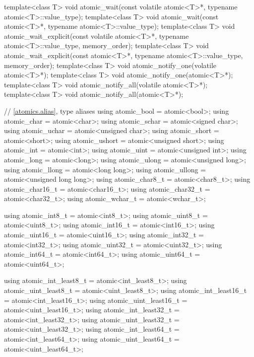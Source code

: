 \begin{codeblock}
{  template<class T>
    void atomic_wait(const volatile atomic<T>*, typename atomic<T>::value_type);
  template<class T>
    void atomic_wait(const atomic<T>*, typename atomic<T>::value_type);
  template<class T>
    void atomic_wait_explicit(const volatile atomic<T>*, typename atomic<T>::value_type,
                              memory_order);
  template<class T>
    void atomic_wait_explicit(const atomic<T>*, typename atomic<T>::value_type,
                              memory_order);
  template<class T>
    void atomic_notify_one(volatile atomic<T>*);
  template<class T>
    void atomic_notify_one(atomic<T>*);
  template<class T>
    void atomic_notify_all(volatile atomic<T>*);
  template<class T>
    void atomic_notify_all(atomic<T>*);

  // \ref{atomics.alias}, type aliases
  using atomic_bool           = atomic<bool>;
  using atomic_char           = atomic<char>;
  using atomic_schar          = atomic<signed char>;
  using atomic_uchar          = atomic<unsigned char>;
  using atomic_short          = atomic<short>;
  using atomic_ushort         = atomic<unsigned short>;
  using atomic_int            = atomic<int>;
  using atomic_uint           = atomic<unsigned int>;
  using atomic_long           = atomic<long>;
  using atomic_ulong          = atomic<unsigned long>;
  using atomic_llong          = atomic<long long>;
  using atomic_ullong         = atomic<unsigned long long>;
  using atomic_char8_t        = atomic<char8_t>;
  using atomic_char16_t       = atomic<char16_t>;
  using atomic_char32_t       = atomic<char32_t>;
  using atomic_wchar_t        = atomic<wchar_t>;

  using atomic_int8_t         = atomic<int8_t>;
  using atomic_uint8_t        = atomic<uint8_t>;
  using atomic_int16_t        = atomic<int16_t>;
  using atomic_uint16_t       = atomic<uint16_t>;
  using atomic_int32_t        = atomic<int32_t>;
  using atomic_uint32_t       = atomic<uint32_t>;
  using atomic_int64_t        = atomic<int64_t>;
  using atomic_uint64_t       = atomic<uint64_t>;

  using atomic_int_least8_t   = atomic<int_least8_t>;
  using atomic_uint_least8_t  = atomic<uint_least8_t>;
  using atomic_int_least16_t  = atomic<int_least16_t>;
  using atomic_uint_least16_t = atomic<uint_least16_t>;
  using atomic_int_least32_t  = atomic<int_least32_t>;
  using atomic_uint_least32_t = atomic<uint_least32_t>;
  using atomic_int_least64_t  = atomic<int_least64_t>;
  using atomic_uint_least64_t = atomic<uint_least64_t>;

}
\end{codeblock}
